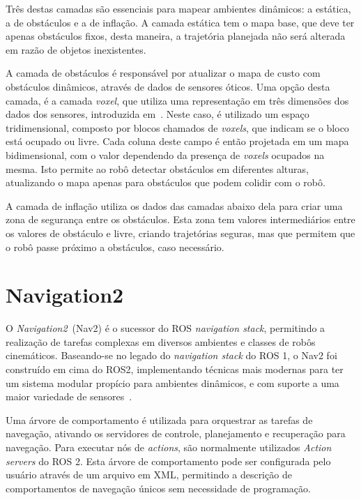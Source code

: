 \documentclass[repeatfields,xlists,xpacks,oneside,yearsonly]{ufrgscca}
\begin{document}
Três destas camadas são essenciais para mapear ambientes dinâmicos: a
estática, a de obstáculos e a de inflação. A camada estática tem o
mapa base, que deve ter apenas obstáculos fixos, desta maneira, a
trajetória planejada não será alterada em razão de objetos
inexistentes.

A camada de obstáculos é responsável por atualizar o mapa de custo
com obstáculos dinâmicos, através de dados de sensores óticos. Uma
opção desta camada, é a camada \textit{voxel}, que utiliza uma
representação em três dimensões dos dados dos sensores, introduzida
em~\textcite{office_marathon}. Neste caso, é utilizado um espaço
tridimensional, composto por blocos chamados de \textit{voxels}, que
indicam se o bloco está ocupado ou livre. Cada coluna deste campo é
então projetada em um mapa bidimensional, com o valor dependendo da
presença de \textit{voxels} ocupados na mesma. Isto permite ao robô
detectar obstáculos em diferentes alturas, atualizando o mapa apenas
para obstáculos que podem colidir com o robô.

A camada de inflação utiliza os dados das camadas abaixo dela para
criar uma zona de segurança entre os obstáculos. Esta zona tem
valores intermediários entre os valores de obstáculo e livre, criando
trajetórias seguras, mas que permitem que o robô passe próximo a
obstáculos, caso necessário.

\section{Navigation2}


O \textit{Navigation2}~(Nav2) é o sucessor do ROS \textit{navigation
    stack}, permitindo a realização de tarefas complexas em diversos
ambientes e classes de robôs cinemáticos. Baseando-se no legado do
\textit{navigation stack} do ROS 1, o Nav2 foi construído em cima do
ROS2, implementando técnicas mais modernas para ter um sistema
modular propício para ambientes dinâmicos, e com suporte a uma maior
variedade de sensores~\cite{Nav2}.

Uma árvore de comportamento é utilizada para orquestrar as tarefas de
navegação, ativando os servidores de controle, planejamento e
recuperação para navegação. Para executar nós de \textit{actions},
são normalmente utilizados \textit{Action servers} do ROS 2. Esta
árvore de comportamento pode ser configurada pelo usuário através de
um arquivo em XML, permitindo a descrição de comportamentos de
navegação únicos sem necessidade de programação.
\end{document}
